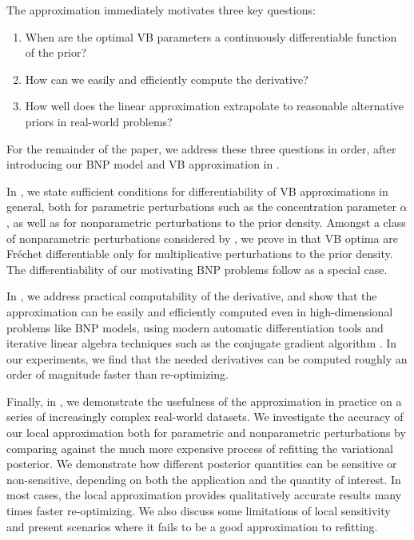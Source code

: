 The approximation immediately motivates three key questions:
%
\begin{enumerate}
%
\item {}
    When are the optimal VB parameters a continuously differentiable
    function of the prior?
%
\item {}
    How can we easily and efficiently compute the derivative?
%
\item {}
    How well does the linear approximation extrapolate to reasonable
    alternative priors in real-world problems?
%
\end{enumerate}
%
For the remainder of the paper, we address these three questions in order, after
introducing our BNP model and VB approximation in .

In , we state sufficient conditions for
differentiability of VB approximations in general, both for parametric
perturbations such as the concentration parameter $\alpha$, as well as for
nonparametric perturbations to the prior density.  Amongst a class of
nonparametric perturbations considered by \citet{gustafson:1996:local}, we prove
in  that VB optima are Fr{\'e}chet
differentiable only for multiplicative perturbations to the prior density. The
differentiability of our motivating BNP problems follow as a special case.

In , we address practical computability of the
derivative, and show that the approximation can be easily and efficiently
computed even in high-dimensional problems like BNP models, using modern
automatic differentiation tools \citep{baydin:2018:automatic, jax2018github} and
iterative linear algebra techniques such as the conjugate gradient algorithm
\citep{nocedal:2006:numerical}.  In our experiments, we find that the  needed
derivatives can be computed roughly an order of magnitude faster than
re-optimizing.

Finally, in , we demonstrate the usefulness of the approximation
in practice on a series of increasingly complex real-world datasets.  We
investigate the accuracy of our local approximation both for parametric and
nonparametric perturbations by comparing against the much more expensive process
of refitting the variational posterior.  We demonstrate how different posterior
quantities can be sensitive or non-sensitive, depending on both the application
and the quantity of interest.  In most cases, the local approximation provides
qualitatively accurate results many times faster re-optimizing.  We also discuss
some limitations of local sensitivity and present scenarios where it fails to be
a good approximation to refitting.

